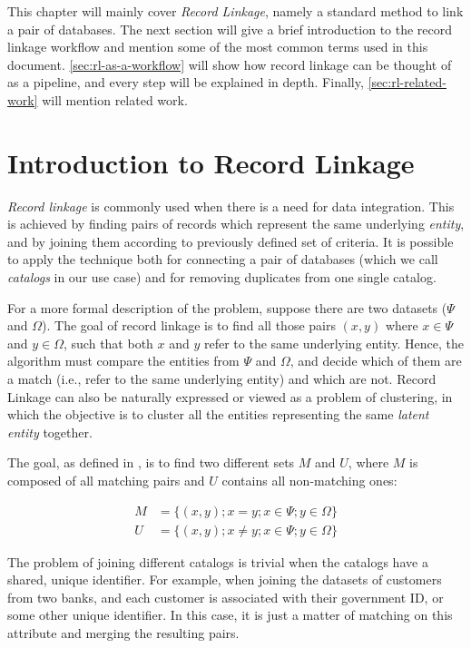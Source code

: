 \documentclass[epsfig,a4paper,11pt,titlepage,twoside,openany]{book}
\begin{document}
This chapter will mainly cover \textit{Record Linkage}, namely a standard method to link a pair of databases. The next section will give a brief introduction to the record linkage workflow and mention some of the most common terms used in this document. \autoref{sec:rl-as-a-workflow} will show how record linkage can be thought of as a pipeline, and every step will be explained in depth. Finally, \autoref{sec:rl-related-work} will mention related work.

\section{Introduction to Record Linkage}
\label{sec:rl-intro}

\textit{Record linkage} is commonly used when there is a need for data integration. This is achieved by finding pairs of records which represent the same underlying \textit{entity}, and by joining them according to previously defined set of criteria. It is possible to apply the technique both for connecting a pair of databases (which we call \textit{catalogs} in our use case) and for removing duplicates from one single catalog.

  

For a more formal description of the problem, suppose there are two datasets ($\Psi$ and $\Omega$). The goal of record linkage is to find all those pairs $(x, y)$ where $x \in \Psi$ and $y \in \Omega$, such that both $x$ and $y$ refer to the same underlying entity. Hence, the algorithm must compare the entities from $\Psi$ and $\Omega$, and decide which of them are a match (i.e., refer to the same underlying entity) and which are not. 
Record Linkage can also be naturally expressed or viewed as a problem of clustering, in which the objective is to cluster all the entities representing the same \textit{latent entity} together.

The goal, as defined in \cite{fellegi69_theor_recor_linkag}, is to find two different sets $M$ and $U$, where $M$ is composed of all matching pairs and $U$ contains all non-matching ones:

\begin{align*}
  M &= \{(x, y); x = y; x \in \Psi; y \in \Omega\} \\
  U &= \{(x, y); x \neq y; x \in \Psi; y \in \Omega\}
\end{align*}

The problem of joining different catalogs is trivial when the catalogs have a
shared, unique identifier. For example, when joining the datasets of
customers from two banks, and each customer is associated with their government
ID, or some other unique identifier. In this case, it is just a matter of
matching on this attribute and merging the resulting pairs.
\end{document}
